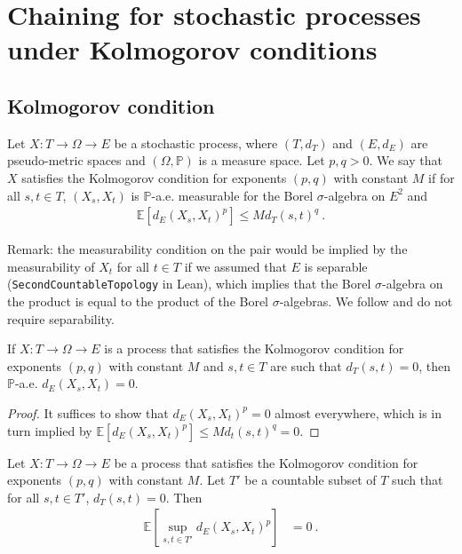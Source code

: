 \section{Chaining for stochastic processes under Kolmogorov conditions}

\subsection{Kolmogorov condition}

\begin{definition}\label{def:IsKolmogorovProcess}
  \mathlibok
Let $X : T \to \Omega \to E$ be a stochastic process, where $(T, d_T)$ and $(E, d_E)$ are pseudo-metric spaces and $(\Omega, \mathbb{P})$ is a measure space.
Let $p, q > 0$.
We say that $X$ satisfies the Kolmogorov condition for exponents $(p,q)$ with constant $M$ if for all $s, t \in T$, $(X_s, X_t)$ is $\mathbb{P}$-a.e. measurable for the Borel $\sigma$-algebra on $E^2$ and
\begin{align*}
  \mathbb{E}[d_E(X_s, X_t)^p] \le M d_T(s, t)^q
  \: .
\end{align*}
\end{definition}

Remark: the measurability condition on the pair would be implied by the measurability of $X_t$ for all $t \in T$ if we assumed that $E$ is separable (\texttt{SecondCountableTopology} in Lean), which implies that the Borel $\sigma$-algebra on the product is equal to the product of the Borel $\sigma$-algebras.
We follow \cite{kratschmer2023kolmogorov} and do not require separability.


\begin{lemma}\label{lem:IsKolmogorovProcess.edist_eq_zero}
  \mathlibok
If $X : T \to \Omega \to E$ is a process that satisfies the Kolmogorov condition for exponents $(p,q)$ with constant $M$ and $s, t \in T$ are such that $d_T(s, t) = 0$, then $\mathbb{P}$-a.e. $d_E(X_s, X_t) = 0$.
\end{lemma}

\begin{proof}It suffices to show that $d_E(X_s, X_t)^p = 0$ almost everywhere, which is in turn implied by $\mathbb{E}[d_E(X_s, X_t)^p] \le M d_t(s, t)^q = 0$.
\end{proof}


\begin{lemma}\label{lem:IsKolmogorovProcess.lintegral_sup_rpow_edist_eq_zero}
  \leanok
Let $X : T \to \Omega \to E$ be a process that satisfies the Kolmogorov condition for exponents $(p,q)$ with constant $M$.
Let $T'$ be a countable subset of $T$ such that for all $s, t \in T'$, $d_T(s, t) = 0$.
Then
\begin{align*}
  \mathbb{E}\left[ \sup_{s, t \in T'} d_E(X_s, X_t)^p \right]
  &= 0
  \: .
\end{align*}
\end{lemma}


